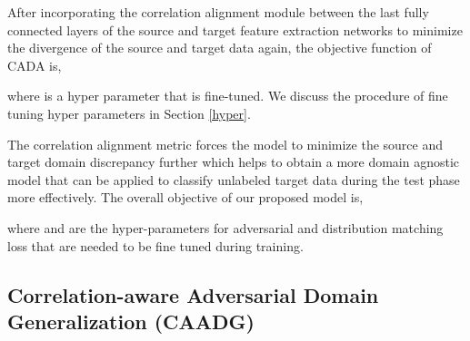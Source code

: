 \documentclass[review]{elsarticle}
\begin{document}
After incorporating the correlation alignment module between the last fully connected layers of the source and target feature extraction networks to minimize the divergence of the source and target data again, the objective function of CADA is,





\noindent where  is a hyper parameter that is fine-tuned. We discuss the procedure of fine tuning hyper parameters in Section \ref{hyper}.

The correlation alignment  metric forces the model to minimize the source and target domain discrepancy further which helps to obtain a more domain agnostic model that can be applied to classify unlabeled target data during the test phase more effectively. The overall objective of our proposed model is,



where  and  are the hyper-parameters for adversarial and distribution matching loss that are needed to be fine tuned during training. 






\subsection{Correlation-aware Adversarial Domain Generalization (CAADG)}
\end{document}
